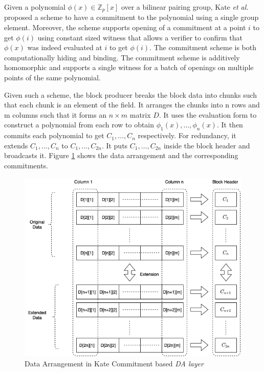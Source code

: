 \documentclass[sigconf, screen=true, nonacm]{acmart}
\newcommand{\DA}{\textit{DA layer}}
\begin{document}
        Given a polynomial $\phi(x) \in \mathbb{Z}_p[x]$ over a bilinear pairing group, Kate \textit{et al.} proposed a scheme to have a commitment to the polynomial using a single group element. Moreover, the scheme supports opening of a commitment at a point $i$ to get $\phi(i)$ using constant sized witness that allows a verifier to confirm that $\phi(x)$ was indeed evaluated at $i$ to get $\phi(i)$. The commitment scheme is both computationally hiding and binding. The commitment scheme is additively homomorphic and supports a single witness for a batch of openings on multiple points of the same polynomial.
        
        Given such a scheme, the block producer breaks the block data into chunks such that each chunk is an element of the field. It arranges the chunks into n rows and m columns such that it forms an $n \times m$ matrix $D$. It uses the evaluation form to construct a polynomial from each row to obtain $\phi_1(x), \dots, \phi_n(x)$. It then commits each polynomial to get $C_1, \dots, C_n$ respectively. For redundancy, it extends $C_1, \dots, C_n$ to $C_1, \dots, C_{2n}$. It puts $C_1, \dots, C_{2n}$ inside the block header and broadcasts it. Figure \ref{fig:KC_data} shows the data arrangement and the corresponding commitments. 

        \begin{figure}[h]
            \centering
            \includegraphics[width=\linewidth]{DA-KC-Data.png}
            \caption{Data Arrangement in Kate Commitment based \DA}
            \label{fig:KC_data}
        \end{figure}
\end{document}
